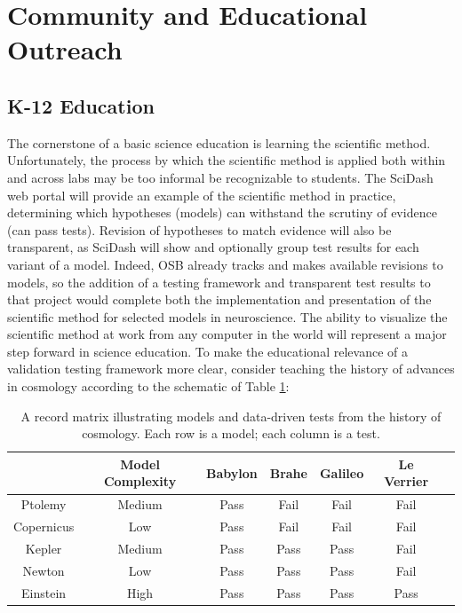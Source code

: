 \documentclass[11pt,letterpaper]{article}
\begin{document}
\section{Community and Educational Outreach}
\subsection{K-12 Education}
The cornerstone of a basic science education is learning the scientific method.  Unfortunately, the process by which the scientific method is applied both within and across labs may be too informal be recognizable to students.  The SciDash web portal will provide an example of the scientific method in practice, determining which hypotheses (models) can withstand the scrutiny of evidence (can pass tests).  Revision of hypotheses to match evidence will also be transparent, as SciDash will show and optionally group test results for each variant of a model.  Indeed, OSB already tracks and makes available revisions to models, so the addition of a testing framework and transparent test results to that project would complete both the implementation and presentation of the scientific method for selected models in neuroscience.  The ability to visualize the scientific method at work from any computer in the world will represent a major step forward in science education.  
To make the educational relevance of a validation testing framework more clear, consider teaching the history of advances in cosmology according 
to the schematic of Table \ref{table:record_matrix}:  

\begin{table}[h]
\caption{A record matrix illustrating models and data-driven tests from the history of cosmology.  Each row is a model; each column is a test.}
\label{table:record_matrix}
\begin{tabular}{| c | c | c | c | c | c | c |}
\hline
		& Model Complexity & Babylon & Brahe & Galileo & Le Verrier \\ \hline
	Ptolemy & Medium & Pass & Fail & Fail & Fail \\ \hline
	Copernicus & Low & Pass & Fail & Fail & Fail \\ \hline
	Kepler & Medium & Pass & Pass & Pass & Fail \\ \hline
	Newton & Low & Pass & Pass & Pass & Fail \\ \hline
	Einstein & High & Pass & Pass & Pass & Pass \\ \hline
\end{tabular}
\end{table}
\end{document}
